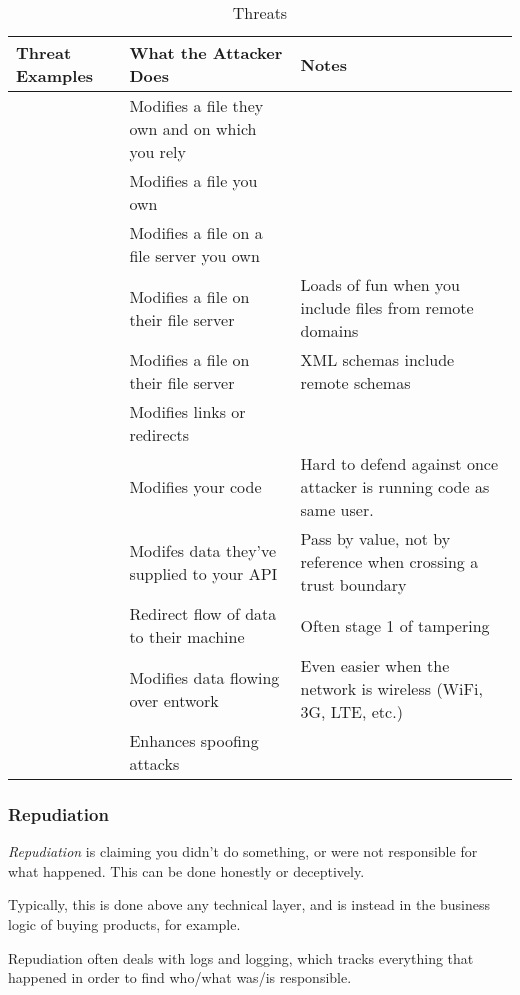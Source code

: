 \begin{table}[h!]
  \centering
  \begin{tabular}{p{5.7cm}p{5.7cm}p{5.7cm}}
    \toprule
    Threat Examples & What the Attacker Does & Notes \\
    \midrule
    \multirow{6}{5.7cm}{\nameref{par:Tampering_File}} & Modifies a file they own and on which you rely & \\ \cline{2-3}
                                               & Modifies a file you own & \\ \cline{2-3}
                                               & Modifies a file on a file server you own & \\ \cline{2-3}
                                               & Modifies a file on their file server & Loads of fun when you include files from remote domains \\ \cline{2-3}
                                               & Modifies a file on their file server & XML schemas include remote schemas \\ \cline{2-3}
    & Modifies links or redirects & \\
    \midrule
    \multirow{6}{5.7cm}{\nameref{par:Tampering_Memory}} & Modifies your code & Hard to defend against once attacker is running code as same user. \\ \cline{2-3}
    & Modifes data they've supplied to your API & Pass by value, not by reference when crossing a trust boundary \\
    \midrule
    \multirow{6}{5.7cm}{\nameref{par:Tampering_Network}} & Redirect flow of data to their machine & Often stage 1 of tampering \\ \cline{2-3}
                                               & Modifies data flowing over entwork & Even easier when the network is wireless (WiFi, 3G, LTE, etc.) \\ \cline{2-3}
    & Enhances spoofing attacks & \\
    \bottomrule
  \end{tabular}
  \caption{ Threats}
  \label{tab:Tampering_Threats}
\end{table}

\subsubsection{Repudiation}\label{subsubsec:Repudiation}
\begin{definition}[Repudiation]\label{def:Repudiation}
  \emph{Repudiation} is claiming you didn't do something, or were not responsible for what happened.
  This can be done honestly or deceptively.

  Typically, this is done above any technical layer, and is instead in the business logic of buying products, for example.

  Repudiation often deals with logs and logging, which tracks everything that happened in order to find who/what was/is responsible.
\end{definition}

